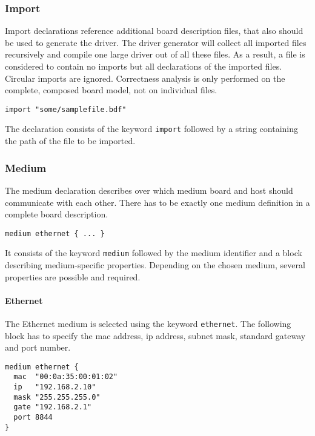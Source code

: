 \documentclass{report}
\begin{document}
\subsubsection{Import}
Import declarations reference additional board description files, that also should be used to generate the driver. The driver generator will collect all imported files recursively and compile one large driver out of all these files. As a result, a file is considered to contain no imports but all declarations of the imported files. Circular imports are ignored. Correctness analysis is only performed on the complete, composed board model, not on individual files. 

\begin{lstlisting}[language=bdl]
import "some/samplefile.bdf"
\end{lstlisting}

The declaration consists of the keyword \texttt{import} followed by a string containing the path of the file to be imported.

\subsubsection{Medium}
The medium declaration describes over which medium board and host should communicate with each other. There has to be exactly one medium definition in a complete board description.

\begin{lstlisting}[language=bdl]
medium ethernet { ... }
\end{lstlisting}

It consists of the keyword \texttt{medium} followed by the medium identifier and a block describing medium-specific properties. Depending on the chosen medium, several properties are possible and required.

\paragraph{Ethernet}
The Ethernet medium is selected using the keyword \texttt{ethernet}. The following block has to specify the mac address, ip address, subnet mask, standard gateway and port number.

\begin{lstlisting}[language=bdl]
medium ethernet {
  mac  "00:0a:35:00:01:02"
  ip   "192.168.2.10"
  mask "255.255.255.0"
  gate "192.168.2.1"
  port 8844
}
\end{lstlisting}
\end{document}
